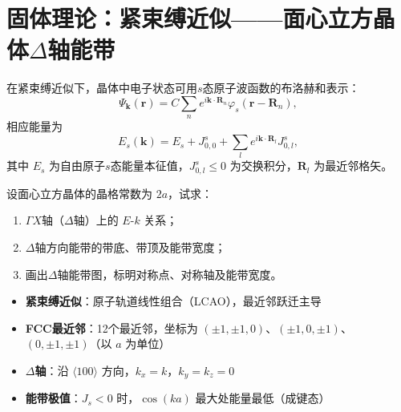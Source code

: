 \section{固体理论：紧束缚近似——面心立方晶体$\Delta$轴能带}
\label{sec:tight-binding-fcc-delta}

\begin{modelbox}
在紧束缚近似下，晶体中电子状态可用$s$态原子波函数的布洛赫和表示：
\[
\Psi_{\bm{k}}(\bm{r}) = C\sum_{n}e^{i\bm{k}\cdot\bm{R}_n}\varphi_s(\bm{r}-\bm{R}_n),
\]
相应能量为
\[
E_s(\bm{k}) = E_s + J_{0,0}^{s} + \sum_{l}e^{i\bm{k}\cdot\bm{R}_l}J_{0,l}^{s},
\]
其中 $E_s$ 为自由原子$s$态能量本征值，$J_{0,l}^{s}\le 0$ 为交换积分，$\bm{R}_l$ 为最近邻格矢。

设面心立方晶体的晶格常数为 $2a$，试求：
\begin{enumerate}
    \item $\Gamma X$轴（$\Delta$轴）上的 $E$-$k$ 关系；
    \item $\Delta$轴方向能带的带底、带顶及能带宽度；
    \item 画出$\Delta$轴能带图，标明对称点、对称轴及能带宽度。
\end{enumerate}
\end{modelbox}

\begin{tipbox}[考点快速分析]
\begin{itemize}
    \item \textbf{紧束缚近似}：原子轨道线性组合（LCAO），最近邻跃迁主导
    \item \textbf{FCC最近邻}：12个最近邻，坐标为 $(\pm1,\pm1,0)$、$(\pm1,0,\pm1)$、$(0,\pm1,\pm1)$（以 $a$ 为单位）
    \item \textbf{$\Delta$轴}：沿 $\langle100\rangle$ 方向，$k_x=k$，$k_y=k_z=0$
    \item \textbf{能带极值}：$J_s<0$ 时，$\cos(ka)$ 最大处能量最低（成键态）
\end{itemize}
\end{tipbox}

